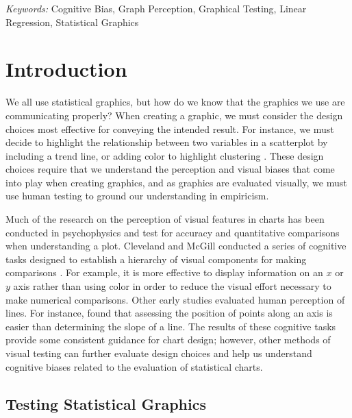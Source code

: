 \documentclass[12pt]{article}
\begin{document}
\noindent%
{\it Keywords:} Cognitive Bias, Graph Perception, Graphical
Testing, Linear Regression, Statistical Graphics
\vfill

\newpage
{} %

\hypertarget{introduction}{%
\section{Introduction}\label{introduction}}

We all use statistical graphics, but how do we know that the graphics we
use are communicating properly? When creating a graphic, we must
consider the design choices most effective for conveying the intended
result. For instance, we must decide to highlight the relationship
between two variables in a scatterplot by including a trend line, or
adding color to highlight clustering \citep{vanderplas2017clusters}.
These design choices require that we understand the perception and
visual biases that come into play when creating graphics, and as
graphics are evaluated visually, we must use human testing to ground our
understanding in empiricism.

Much of the research on the perception of visual features in charts has
been conducted in psychophysics and test for accuracy and quantitative
comparisons when understanding a plot. Cleveland and McGill conducted a
series of cognitive tasks designed to establish a hierarchy of visual
components for making comparisons \citep{cleveland1984graphical}. For
example, it is more effective to display information on an \(x\) or
\(y\) axis rather than using color in order to reduce the visual effort
necessary to make numerical comparisons. Other early studies evaluated
human perception of lines. For instance, \citet{cleveland1985graphical}
found that assessing the position of points along an axis is easier than
determining the slope of a line. The results of these cognitive tasks
provide some consistent guidance for chart design; however, other
methods of visual testing can further evaluate design choices and help
us understand cognitive biases related to the evaluation of statistical
charts.

\hypertarget{testing-statistical-graphics}{%
\subsection{Testing Statistical
Graphics}\label{testing-statistical-graphics}}
\end{document}
